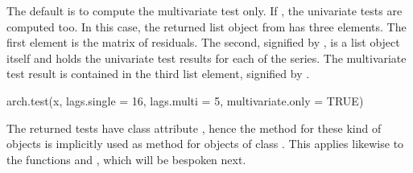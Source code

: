 \documentclass[nojss]{jss}
\begin{document}
The default is to compute the multivariate test only. If
, the univariate tests are computed
too. In this case, the returned list object from 
has three elements. The first element is the matrix of residuals. The
second, signified by , is a list object itself and
holds the univariate test results for each of the series. The
multivariate test result is contained in the third list element,
signified by .  
\begin{CodeInput}
arch.test(x, lags.single = 16, lags.multi = 5, multivariate.only = TRUE)
\end{CodeInput}  
The returned tests have class attribute , hence the
 method for these kind of objects is implicitly used as
 method for objects of class . This applies
likewise to the functions  and
, which will be bespoken next.
\end{document}

